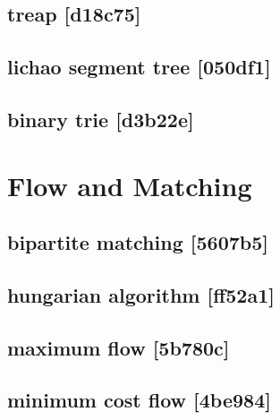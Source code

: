 \subsection{treap {\footnotesize [d18c75]} }

\subsection{lichao segment tree {\footnotesize [050df1]} }

\subsection{binary trie {\footnotesize [d3b22e]} }


\section{Flow and Matching}
\subsection{bipartite matching {\footnotesize [5607b5]} }

\subsection{hungarian algorithm {\footnotesize [ff52a1]} }

\subsection{maximum flow {\footnotesize [5b780c]} }

\subsection{minimum cost flow {\footnotesize [4be984]} }

